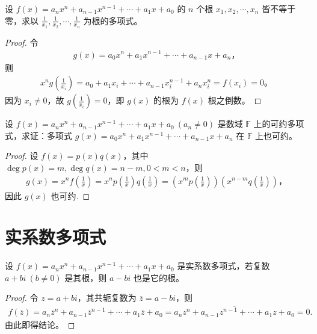 \documentclass[lang=cn,newtx,10pt,scheme=chinese]{elegantbook}
\begin{document}
\begin{example}
设 $f(x) = a_n x^n + a_{n-1} x^{n-1} + \cdots + a_1 x + a_0$ 的 $n$ 个根 $x_1, x_2, \cdots, x_n$ 皆不等于零，求以 $\frac{1}{x_1}, \frac{1}{x_2}, \cdots, \frac{1}{x_n}$ 为根的多项式。
\end{example}
\begin{proof}
令
\begin{align*}
g(x) = a_0 x^n + a_1 x^{n-1} + \cdots + a_{n-1} x + a_n，
\end{align*}
则
\begin{align*}
x^n g\left(\frac{1}{x_i}\right) = a_0 + a_1 x_i + \cdots + a_{n-1} x_i^{n-1} + a_n x_i^n = f(x_i) = 0。
\end{align*}
因为 $x_i \neq 0$，故 $g\left(\frac{1}{x_i}\right) = 0$，即 $g(x)$ 的根为 $f(x)$ 根之倒数。
\end{proof}

\begin{example}
设 $f(x) = a_n x^n + a_{n-1} x^{n-1} + \cdots + a_1 x + a_0 \ (a_n \neq 0)$ 是数域 $\mathbb{F}$ 上的可约多项式，求证：多项式 $g(x) = a_0 x^n + a_1 x^{n-1} + \cdots + a_{n-1} x + a_n$ 在 $\mathbb{F}$ 上也可约。
\end{example}
\begin{proof}
设 $f(x) = p(x) q(x)$，其中 $\deg p(x) = m, \deg q(x) = n - m, 0 < m < n$，则
\begin{align*}
g(x) = x^n f\left(\frac{1}{x}\right) = x^n p\left(\frac{1}{x}\right) q\left(\frac{1}{x}\right) = \left(x^m p\left(\frac{1}{x}\right)\right) \left(x^{n-m} q\left(\frac{1}{x}\right)\right)，
\end{align*}
因此 $g(x)$ 也可约.
\end{proof}


\section{实系数多项式}

\begin{theorem}[实系数多项式的复根成对出现]\label{theorem:实系数多项式的复根成对出现}
设 $f(x) = a_n x^n + a_{n-1} x^{n-1} + \cdots + a_1 x + a_0$ 是实系数多项式，若复数 $a + bi \ (b \neq 0)$ 是其根，则 $a - bi$ 也是它的根。
\end{theorem}
\begin{proof}
令 $z = a + bi$，其共轭复数为 $\overline{z} = a - bi$，则
\begin{align*}
f(\overline{z})=a_n\overline{z}^n+a_{n-1}\overline{z}^{n-1}+\cdots +a_1\overline{z}+a_0=\overline{a_nz^n+a_{n-1}z^{n-1}+\cdots +a_1z+a_0}=0.
\end{align*}
由此即得结论。
\end{proof}
\end{document}
